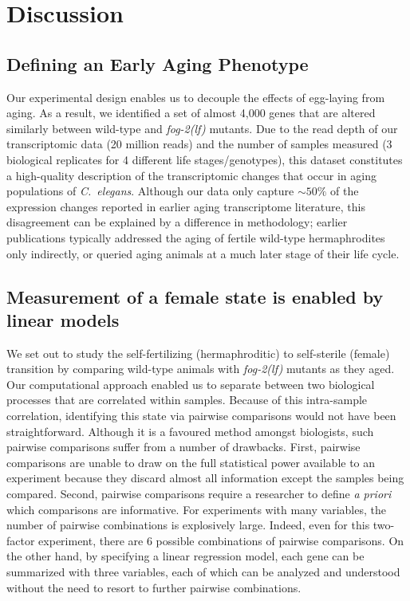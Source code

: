 \documentclass[10pt,letterpaper,twocolumn]{article}
\newcommand{\cel}{\emph{C.~elegans}}
\newcommand{\fog}{\emph{\mbox{fog-2(lf)}}}
\begin{document}
\section*{Discussion}
\label{sec:discussion}

\subsection*{Defining an Early Aging Phenotype}
\label{sub:Defining an Early Aging Phenotype}

Our experimental design enables us to decouple the effects of egg-laying from
aging. As a result, we identified a set of almost 4,000 genes that are altered
similarly between wild-type and \fog{} mutants. Due to the read depth of our
transcriptomic data (20 million reads) and the number of samples measured (3
biological replicates for 4 different life stages/genotypes), this dataset
constitutes a high-quality description of the transcriptomic changes that occur
in aging populations of \cel{}.
Although our data only capture $\sim50\%$ of the expression changes reported
in earlier aging transcriptome literature, this disagreement can be explained
by a difference in methodology; earlier publications typically addressed the
aging of fertile wild-type hermaphrodites only indirectly, or queried aging
animals at a much later stage of their life cycle.


\subsection*{Measurement of a female state is enabled by linear models}
\label{sub:female_state}

We set out to study the self-fertilizing (hermaphroditic) to self-sterile
(female) transition by comparing wild-type animals with \fog{} mutants as they
aged. Our computational approach enabled us to separate between two biological
processes that are correlated within samples. Because of this intra-sample
correlation, identifying this state via pairwise comparisons would not have been
straightforward. Although it is a favoured method amongst biologists, such
pairwise comparisons suffer from a number of drawbacks.
First, pairwise comparisons are unable to draw on the full statistical power
available to an experiment because they discard almost all information except
the samples being compared. Second, pairwise comparisons require a researcher
to define \emph{a priori} which comparisons are informative. For experiments
with many variables, the number of pairwise combinations is explosively large.
Indeed, even for this two-factor experiment, there are 6 possible combinations
of pairwise comparisons. On the other hand, by specifying a linear regression
model, each gene can be summarized with three variables, each of which can be
analyzed and understood without the need to resort to further pairwise
combinations.
\end{document}

